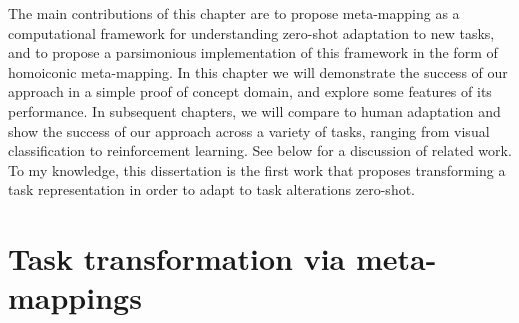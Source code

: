 
The main contributions of this chapter are to propose meta-mapping as a computational framework for understanding zero-shot adaptation to new tasks, and to propose a parsimonious implementation of this framework in the form of homoiconic meta-mapping. In this chapter we will demonstrate the success of our approach in a simple proof of concept domain, and explore some features of its performance. In subsequent chapters, we will compare to human adaptation and show the success of our approach across a variety of tasks, ranging from visual classification to reinforcement learning. See below for a discussion of related work. To my knowledge, this dissertation is the first work that proposes transforming a task representation in order to adapt to task alterations zero-shot. 


\section{Task transformation via meta-mappings} \label{sec:HoMM:metamappings}

